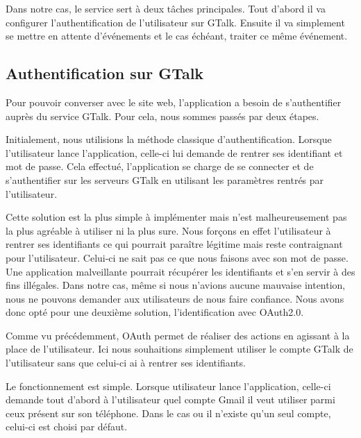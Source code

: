 Dans notre cas, le service sert à deux tâches principales. Tout d'abord il va configurer l'authentification
de l'utilisateur sur GTalk. Ensuite il va simplement se mettre en attente d'événements et le cas échéant, 
traiter ce même événement.



\subsection{Authentification sur GTalk}

Pour pouvoir converser avec le site web, l'application a besoin de s'authentifier auprès du service
GTalk. Pour cela, nous sommes passés par deux étapes. 
 
Initialement, nous utilisions la méthode classique d'authentification. Lorsque l'utilisateur lance 
l'application, celle-ci lui demande de rentrer ses identifiant et mot de passe. Cela effectué, 
l'application se charge de se connecter et de s'authentifier sur les serveurs GTalk en utilisant les
paramètres rentrés par l'utilisateur.

Cette solution est la plus simple à implémenter mais n'est malheureusement pas la plus agréable
à utiliser ni la plus sure. Nous forçons en effet l'utilisateur à rentrer ses identifiants ce qui 
pourrait paraître légitime mais reste contraignant pour l'utilisateur. Celui-ci ne sait pas ce que 
nous faisons avec son mot de passe. Une application malveillante pourrait récupérer les identifiants
et s'en servir à des fins illégales. Dans notre cas, même si nous n'avions aucune mauvaise intention,
nous ne pouvons demander aux utilisateurs de nous faire confiance. Nous avons donc opté pour une 
deuxième solution, l'identification avec OAuth2.0.

Comme vu précédemment, OAuth permet de réaliser des actions en agissant à la place de l'utilisateur. 
Ici nous souhaitions simplement utiliser le compte GTalk de l'utilisateur sans que celui-ci ai à rentrer
ses identifiants. 

Le fonctionnement est simple. Lorsque utilisateur lance l'application, celle-ci demande tout d'abord
à l'utilisateur quel compte Gmail il veut utiliser parmi ceux présent sur son téléphone. Dans le cas
ou il n'existe qu'un seul compte, celui-ci est choisi par défaut.
\\


